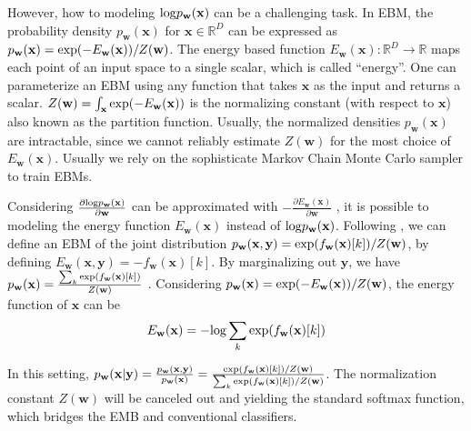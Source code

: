 \documentclass[a4paper,conference]{IEEEtran}
\theoremstyle{plain}%
\begin{document}
However, how to modeling ${\rm log}p_{\mathbf{w}}(\mathbf{x})$ can be a challenging task. In EBM, the probability density $p_{\mathbf{w}}(\mathbf{x})$ for $\mathbf{x}\in\mathbb{R}^D$ can be expressed as $p_{\mathbf{w}}(\mathbf{x})={\rm exp}(-E_{\mathbf{w}}(\mathbf{x}))/Z(\mathbf{w})$. The energy based function $E_{\mathbf{w}}(\mathbf{x}):\mathbb{R}^D\rightarrow\mathbb{R}$ maps each point of an input space to a single scalar, which is called “energy”. One can parameterize an EBM using any function that takes $\mathbf{x}$ as the input and returns a scalar. $Z(\mathbf{w})=\int_{\mathbf{x}}{\rm exp}(-E_{\mathbf{w}}(\mathbf{x}))$ is the normalizing constant (with respect to $\mathbf{x}$) also known as the partition function. Usually, the normalized densities $p_{\mathbf{w}}(\mathbf{x})$ are intractable, since we cannot reliably estimate $Z(\mathbf{w})$ for the most choice of $E_{\mathbf{w}}(\mathbf{x})$. Usually we rely on the sophisticate Markov Chain Monte Carlo sampler to train EBMs. 



Considering $\frac{\partial{\rm log}p_{\mathbf{w}}(\mathbf{x})}{\partial{\mathbf{w}}}$ can be approximated with $-\frac{\partial E_{\mathbf{w}}(\mathbf{x})}{\partial{\mathbf{w}}}$ \cite{grathwohl2019your}, it is possible to modeling the energy function $E_{\mathbf{w}}(\mathbf{x})$ instead of ${\rm log}p_{\mathbf{w}}(\mathbf{x})$. Following \cite{grathwohl2019your}, we can define an EBM of the joint distribution $p_{\mathbf{w}}(\mathbf{x},\mathbf{y})={\rm exp}(f_{\mathbf{w}}({\mathbf{x}})[k])/Z({\mathbf{w}})$, by defining $E_{\mathbf{w}}(\mathbf{x},\mathbf{y})=-f_{\mathbf{w}}({\mathbf{x}})[k]$. By marginalizing out $\mathbf{y}$, we have $p_{\mathbf{w}}(\mathbf{x})=\frac{\sum_k{\rm exp}(f_{\mathbf{w}}({\mathbf{x}})[k])}{Z({\mathbf{w}})}$ \cite{grathwohl2019your}. Considering $p_{\mathbf{w}}(\mathbf{x})={\rm exp}(-E_{\mathbf{w}}(\mathbf{x}))/Z(\mathbf{w})$, the energy function of $\mathbf{x}$ can be
\begin{align}\label{energy} E_{\mathbf{w}}(\mathbf{x})=-{\rm log}\sum_k{\rm exp}{(f_{\mathbf{w}}({\mathbf{x}})[k])}
\end{align} 


In this setting, $p_{\mathbf{w}}(\mathbf{x}|\mathbf{y})=\frac{p_{\mathbf{w}}(\mathbf{x},\mathbf{y})}{p_{\mathbf{w}}(\mathbf{x})}=\frac{{\rm exp}(f_{\mathbf{w}}({\mathbf{x}})[k])/Z({\mathbf{w}})}{{\sum_k{\rm exp}(f_{\mathbf{w}}({\mathbf{x}})[k])}/{Z({\mathbf{w}})}}$. The normalization constant $Z({\mathbf{w}})$ will be canceled out and yielding the standard softmax function, which bridges the EMB and conventional classifiers.
\end{document}
